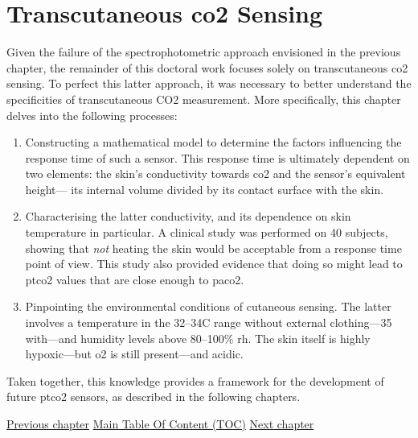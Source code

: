 \chapter{Transcutaneous \texorpdfstring{\gls{co2}}{CO2} Sensing}\label{chap:tcco2}

\begin{tldrbox}
	
	Given the failure of the spectrophotometric approach envisioned in the previous chapter, the remainder of this doctoral work focuses solely on transcutaneous \gls{co2} sensing. To perfect this latter approach, it was necessary to better understand the specificities of transcutaneous CO2 measurement. More specifically, this chapter delves into the following processes:
	\begin{enumerate}
		\item Constructing a mathematical model to determine the factors influencing the response time of such a sensor. This response time is ultimately dependent on two elements: the skin's conductivity towards \gls{co2} and the sensor's equivalent height---\ie{} its internal volume divided by its contact surface with the skin.
		\item Characterising the latter conductivity, and its dependence on skin temperature in particular. A clinical study was performed on 40 subjects, showing that \emph{not} heating the skin would be acceptable from a response time point of view. This study also provided evidence that doing so might lead to \gls{ptco2} values that are close enough to \gls{paco2}.
		\item Pinpointing the environmental conditions of cutaneous sensing. The latter involves a temperature in the 32--34{\degree}C range without external clothing---35{\degree} with---and humidity levels above 80--100\% \gls{rh}. The skin itself is highly hypoxic---but \gls{o2} is still present---and acidic.
	\end{enumerate}
	
	Taken together, this knowledge provides a framework for the development of future \gls{ptco2} sensors, as described in the following chapters.
	
	\tcblower
	
	\hyperref[chap:co2hb]{Previous chapter} \hfill \hyperref[chapter:toc]{Main Table Of Content (TOC)} \hfill \hyperref[chap:choosing_techno]{Next chapter}
	
\end{tldrbox}


